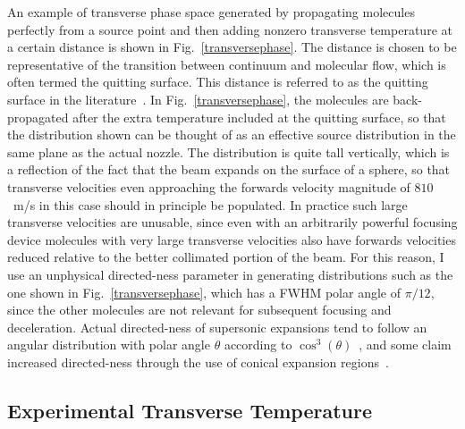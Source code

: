 An example of transverse phase space generated by propagating molecules perfectly from a source point and then adding nonzero transverse temperature at a certain distance is shown in Fig.~\ref{transversephase}.
The distance is chosen to be representative of the transition between continuum and molecular flow, which is often termed the quitting surface.
This distance is referred to as the quitting surface in the literature~\cite{Miller1988}.
In Fig.~\ref{transversephase}, the molecules are back-propagated after the extra temperature included at the quitting surface, so that the distribution shown can be thought of as an effective source distribution in the same plane as the actual nozzle.
The distribution is quite tall vertically, which is a reflection of the fact that the beam expands on the surface of a sphere, so that transverse velocities even approaching the forwards velocity magnitude of $810$~m/s in this case should in principle be populated.
In practice such large transverse velocities are unusable, since even with an arbitrarily powerful focusing device molecules with very large transverse velocities also have forwards velocities reduced relative to the better collimated portion of the beam.
For this reason, I use an unphysical directed-ness parameter in generating distributions such as the one shown in Fig.~\ref{transversephase}, which has a FWHM polar angle of $\pi/12$, since the other molecules are not relevant for subsequent focusing and deceleration.
Actual directed-ness of supersonic expansions tend to follow an angular distribution with polar angle $\theta$ according to $\cos^3(\theta)$~\cite{Miller1988}, and some claim increased directed-ness through the use of conical expansion regions~\cite[Fig.~11]{Even2015}.

\subsection{Experimental Transverse Temperature}

